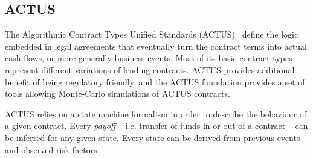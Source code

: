 \documentclass[runningheads]{llncs}
\begin{document}
%
%
%

\subsection{ACTUS}
\label{ACTUS}

The Algorithmic Contract Types Unified Standards (ACTUS)~\cite{actus} define the logic embedded in legal agreements that eventually
turn the contract terms into actual cash flows, or more generally
business events. Most of its basic contract types represent
different variations of lending contracts. 
ACTUS provides additional benefit of being regulatory friendly, and the ACTUS
foundation provides a set of tools allowing Monte-Carlo simulations
of ACTUS contracts.


ACTUS relies on a state machine formalism in order to describe the
behaviour of a given contract. Every \emph{payoff} -- i.e. transfer of funds in
or out of a contract -- can be inferred for any given state. Every state
can be derived from previous events and observed risk factors:
\end{document}
